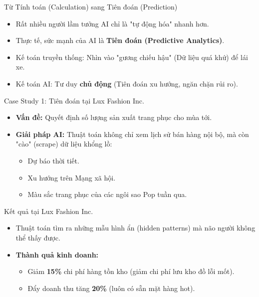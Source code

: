 \documentclass[aspectratio=169,12pt]{beamer}
\begin{document}
\begin{frame}{Từ Tính toán (Calculation) sang Tiên đoán (Prediction)}
    \begin{itemize}
        \item Rất nhiều người lầm tưởng AI chỉ là "tự động hóa" nhanh hơn.
        \item Thực tế, sức mạnh của AI là \textbf{Tiên đoán (Predictive Analytics)}.
        \item Kế toán truyền thống: Nhìn vào "gương chiếu hậu" (Dữ liệu quá khứ) để lái xe.
        \item Kế toán AI: Tư duy \textbf{chủ động} (Tiên đoán xu hướng, ngăn chặn rủi ro).
    \end{itemize}
\end{frame}

\begin{frame}{Case Study 1: Tiên đoán tại Lux Fashion Inc.}
    \begin{itemize}
        \item \textbf{Vấn đề:} Quyết định số lượng sản xuất trang phục cho mùa tới.
        \item \textbf{Giải pháp AI:} Thuật toán không chỉ xem lịch sử bán hàng nội bộ, mà còn "cào" (scrape) dữ liệu khổng lồ:
        \begin{itemize}
            \item Dự báo thời tiết.
            \item Xu hướng trên Mạng xã hội.
            \item Màu sắc trang phục của các ngôi sao Pop tuần qua.
        \end{itemize}
    \end{itemize}
\end{frame}

\begin{frame}{Kết quả tại Lux Fashion Inc.}
    \begin{itemize}
        \item Thuật toán tìm ra những mẫu hình ẩn (hidden patterns) mà não người không thể thấy được.
        \item \textbf{Thành quả kinh doanh:} 
        \begin{itemize}
            \item Giảm \textbf{15\%} chi phí hàng tồn kho (giảm chi phí lưu kho đồ lỗi mốt).
            \item Đẩy doanh thu tăng \textbf{20\%} (luôn có sẵn mặt hàng hot).
        \end{itemize}
    \end{itemize}
\end{frame}
\end{document}
